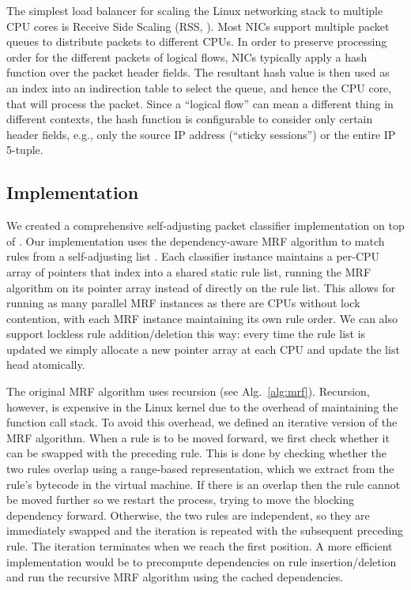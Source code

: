 The simplest load balancer for scaling the Linux networking stack to multiple CPU cores is Receive Side Scaling (RSS, \cite{10.1145/3359989.3365412, rss-linux}). Most NICs support multiple packet queues to distribute packets to different CPUs. In order to preserve processing order for the different packets of logical flows, NICs typically apply a hash function over the packet header fields. The resultant hash value is then used as an index into an indirection table to select the queue, and hence the CPU core, that will process the packet. Since a ``logical flow'' can mean a different thing in different contexts, the hash function is configurable to consider only certain header fields, e.g., only the source IP address (``sticky sessions'') or the entire IP 5-tuple.

\subsection{Implementation}
\label{sec:sa-nf-tables-impl}

We created a comprehensive self-adjusting packet classifier implementation on top of \nftables. Our implementation uses the dependency-aware MRF algorithm to match rules from a self-adjusting list \cite{10228937}. Each classifier instance maintains a per-CPU array of pointers that index into a shared static rule list, running the MRF algorithm on its pointer array instead of directly on the rule list. This allows for running as many parallel MRF instances as there are CPUs without lock contention, with each MRF instance maintaining its own rule order. We can also support lockless rule addition\slash deletion this way: every time the rule list is updated we simply allocate a new pointer array at each CPU and update the list head atomically.

The original MRF algorithm \cite{10228937} uses recursion (see Alg.~\ref{alg:mrf}). Recursion, however, is expensive in the Linux kernel due to the overhead of maintaining the function call stack. To avoid this overhead, we defined an iterative version of the MRF algorithm. When a rule is to be moved forward, we first check whether it can be swapped with the preceding rule. This is done by checking whether the two rules overlap using a range-based representation, which we extract from the rule's bytecode in the \nftables virtual machine. If there is an overlap then the rule cannot be moved further so we restart the process, trying to move the blocking dependency forward. Otherwise, the two rules are independent, so they are immediately swapped and the iteration is repeated with the subsequent preceding rule. The iteration terminates when we reach the first position. A more efficient implementation would be to precompute dependencies on rule insertion\slash deletion and run the recursive MRF algorithm using the cached dependencies. %

